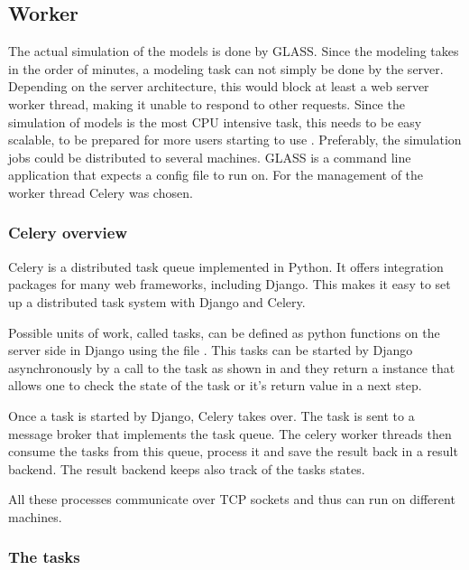 \subsection{Worker}
\label{sec:worker}

The actual simulation of the models is done by GLASS.
Since the modeling takes in the order of minutes, a modeling task can not simply be done by the server.
Depending on the server architecture, this would block at least a web server worker thread, making it unable to respond to other requests.
Since the simulation of models is the most CPU intensive task, this needs to be easy scalable, to be prepared for more users starting to use \spl. 
Preferably, the simulation jobs could be distributed to several machines.
GLASS is a command line application that expects a config file to run on.
For the management of the worker thread Celery was chosen.


\subsubsection{Celery overview}
Celery is a distributed task queue implemented in Python.
It offers integration packages for many web frameworks, including Django.
This makes it easy to set up a distributed task system with Django and Celery.


Possible units of work, called tasks, can be defined as python functions on the server side in Django using the file .
This tasks can be started by Django asynchronously by a call to the task as shown in  and they return a  instance that allows one to check the state of the task or it's return value in a next step.

Once a task is started by Django, Celery takes over.
The task is sent to a message broker that implements the task queue.
The celery worker threads then consume the tasks from this queue, process it and save the result back in a result backend. The result backend keeps also track of the tasks states.

All these processes communicate over TCP sockets and thus can run on different machines.

\subsubsection{The tasks}


